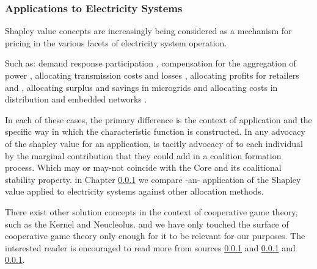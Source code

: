 \subsubsection{Applications to Electricity Systems}

Shapley value concepts are increasingly being considered as a mechanism for pricing in the various facets of electricity system operation.

Such as: demand response participation \cite{DBLP:journals/tsg/OBrienGR15,electronics8010048,WANG201972}, compensation for the aggregation of power \cite{Perez-Diaz:2018:CEV:3237383.3237484,6520960}, allocating transmission costs and losses \cite{ip-gtd_20020005,SHARMA201733}, allocating profits for retailers and \cite{ACUNA2018161,WANG201972}, allocating surplus and savings in microgrids \cite{WU2017384} and allocating costs in distribution and embedded networks \cite{archie_paper1,8226810,10.1007/978-3-642-40776-5_19,6840296,DBLP:journals/corr/abs-1903-10965,AzuatalamCV_PowerTech2019}.





In each of these cases, the primary difference is the context of application and the specific way in which the characteristic function is constructed.
In any advocacy of the shapley value for an application, is tacitly advocacy of to each individual by the marginal contribution that they could add in a coalition formation process.
Which may or may-not coincide with the Core and its coalitional stability property.
in Chapter \ref{} we compare -an- application of the Shapley value applied to electricity systems against other allocation methods.

There exist other solution concepts in the context of cooperative game theory, such as the Kernel and Neucleolus. and we have only touched the surface of cooperative game theory only enough for it to be relevant for our purposes.
The interested reader is encouraged to read more from sources \ref{} and \ref{} and \ref{}.







